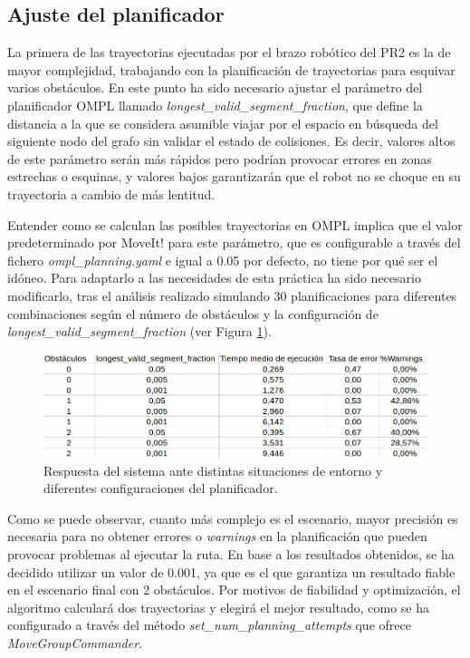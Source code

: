\documentclass[12pt,spanish,chapterprefix, numbers=noenddot]{book}
\numberwithin{equation}{section}
\numberwithin{figure}{section}
\begin{document}
\subsection{Ajuste del planificador}

La primera de las trayectorias ejecutadas por el brazo robótico del PR2 es la de mayor complejidad, trabajando con la planificación de trayectorias para esquivar varios obstáculos. En este punto ha sido necesario ajustar el parámetro del planificador OMPL llamado \textit{longest\_valid\_segment\_fraction}, que define la distancia a la que se considera asumible viajar por el espacio en búsqueda del siguiente nodo del grafo sin validar el estado de colisiones. Es decir, valores altos de este parámetro serán más rápidos pero podrían provocar errores en zonas estrechas o esquinas, y valores bajos garantizarán que el robot no se choque en su trayectoria a cambio de más lentitud. 

Entender como se calculan las posibles trayectorias en OMPL implica que el valor predeterminado por MoveIt! para este parámetro, que es configurable a través del fichero \textit{ompl\_planning.yaml} e igual a 0.05 por defecto, no tiene por qué ser el idóneo. Para adaptarlo a las necesidades de esta práctica ha sido necesario modificarlo, tras el análisis  realizado simulando 30 planificaciones para diferentes combinaciones según el número de obstáculos y la configuración de \textit{longest\_valid\_segment\_fraction}  (ver Figura \ref{fig:analisis_ejecuciones}).

\begin{figure}[hbt!]
\centering
\includegraphics[width=14cm]{Figs/analisis_ejecuciones.png}
\par
\caption{\label{fig:analisis_ejecuciones}Respuesta del sistema ante distintas situaciones de entorno y diferentes configuraciones del planificador.}
\end{figure}

Como se puede observar, cuanto más complejo es el escenario, mayor precisión es necesaria para no obtener errores o \textit{warnings} en la planificación que pueden provocar problemas al ejecutar la ruta. En base a los resultados obtenidos, se ha decidido utilizar un valor de 0.001, ya que es el que garantiza un resultado fiable en el escenario final con 2 obstáculos. Por motivos de fiabilidad y optimización, el algoritmo calculará dos trayectorias y elegirá el mejor resultado, como se ha configurado a través del método \textit{set\_num\_planning\_attempts} que ofrece \textit{MoveGroupCommander}. 
\end{document}
